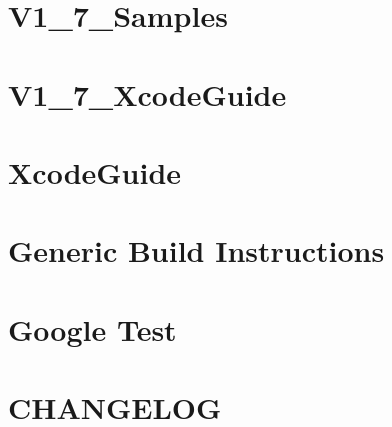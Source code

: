 \documentclass[twoside]{book}
\newcommand{\+}{\discretionary{\mbox{\scriptsize$\hookleftarrow$}}{}{}}
\begin{document}
\chapter{V1\+\_\+7\+\_\+\+Samples}
\label{md_smacc_sm_reference_library_sm_panda_moveit_libfranka_3rdparty_googletest_googletest_docs_V1_7_Samples}

\chapter{V1\+\_\+7\+\_\+\+Xcode\+Guide}
\label{md_smacc_sm_reference_library_sm_panda_moveit_libfranka_3rdparty_googletest_googletest_docs_V1_7_XcodeGuide}

\chapter{Xcode\+Guide}
\label{md_smacc_sm_reference_library_sm_panda_moveit_libfranka_3rdparty_googletest_googletest_docs_XcodeGuide}

\chapter{Generic Build Instructions}
\label{md_smacc_sm_reference_library_sm_panda_moveit_libfranka_3rdparty_googletest_googletest_README}

\chapter{Google Test}
\label{md_smacc_sm_reference_library_sm_panda_moveit_libfranka_3rdparty_googletest_README}

\chapter{C\+H\+A\+N\+G\+E\+L\+OG}
\label{md_smacc_sm_reference_library_sm_panda_moveit_libfranka_CHANGELOG}

\end{document}
